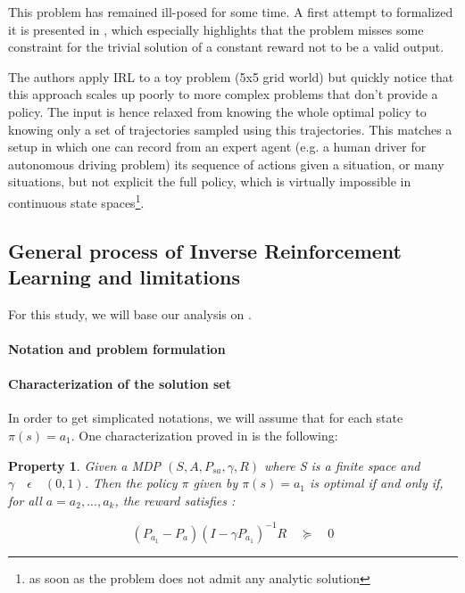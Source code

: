 \documentclass{article}
\newtheorem{property}{Property}
\begin{document}
This problem has remained ill-posed for some time. A first attempt to formalized it is presented in \cite{Ng00}, which especially highlights that the problem misses some constraint for the trivial solution of a constant reward not to be a valid output.

The authors apply IRL to a toy problem (5x5 grid world) but quickly notice that this approach scales up poorly to more complex problems that don't provide a policy. The input is hence relaxed from knowing the whole optimal policy to knowing only a set of trajectories sampled using this trajectories. This matches a setup in which one can record from an expert agent (e.g. a human driver for autonomous driving problem) its sequence of actions given a situation, or many situations, but not explicit the full policy, which is virtually impossible in continuous state spaces\footnote{as soon as the problem does not admit any analytic solution}.


\subsection{General process of Inverse Reinforcement Learning and limitations}

For this study, we will base our analysis on \cite{Ng00}.

\paragraph{Notation and problem formulation}

\paragraph{Characterization of the solution set}

In order to get simplicated notations, we will assume that for each state $\pi( s) = a_{1} $. 
One characterization proved in \cite{Ng00} is the following:

\begin{property}
Given a MDP  $(S,A,P_{sa},\gamma,R)$ where S is a finite space and $\gamma \quad \epsilon \quad (0,1)$. Then the policy $\pi$ given by $ \pi(s)=a_{1}$ is optimal if and only if, for all $a=a_{2},...,a_{k}$, the reward satisfies :

\[
({ P }_{ a_{ 1 } }-{ P }_{ a }){ (I-\gamma { P }_{ { a }_{ 1 } }) }^{ -1 }R\quad \succeq \quad 0
\]
\end{property}
\end{document}
